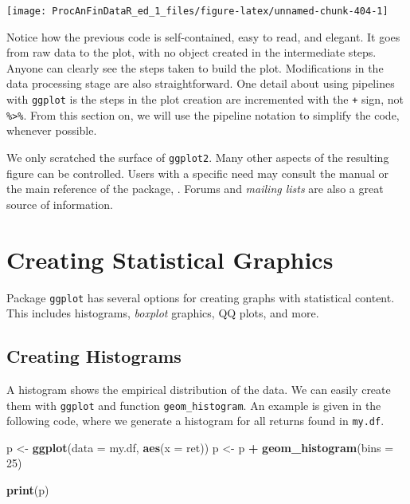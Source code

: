 \documentclass[11pt,]{book}
\newenvironment{Shaded}{\begin{snugshade}}{\end{snugshade}}
\newcommand{\KeywordTok}[1]{\textcolor[rgb]{0.27,0.27,0.27}{\textbf{#1}}}
\newcommand{\DataTypeTok}[1]{\textcolor[rgb]{0.27,0.27,0.27}{#1}}
\newcommand{\DecValTok}[1]{\textcolor[rgb]{0.06,0.06,0.06}{#1}}
\newcommand{\StringTok}[1]{\textcolor[rgb]{0.5,0.5,0.5}{#1}}
\newcommand{\OperatorTok}[1]{\textcolor[rgb]{0.81,0.36,0.00}{\textbf{#1}}}
\newcommand{\NormalTok}[1]{#1}
\begin{document}
\begin{center}\texttt{[image: ProcAnFinDataR\_ed\_1\_files/figure-latex/unnamed-chunk-404-1]} \end{center}

Notice how the previous code is self-contained, easy to read, and
elegant. It goes from raw data to the plot, with no object created in
the intermediate steps. Anyone can clearly see the steps taken to build
the plot. Modifications in the data processing stage are also
straightforward. One detail about using pipelines with \texttt{ggplot}
is the steps in the plot creation are incremented with the \texttt{+}
sign, not \texttt{\%\textgreater{}\%}. From this section on, we will use
the pipeline notation to simplify the code, whenever possible.

We only scratched the surface of \texttt{ggplot2}. Many other aspects of
the resulting figure can be controlled. Users with a specific need may
consult the manual or the main reference of the package,
\citet{wickham2009ggplot2}. Forums and \emph{mailing lists} are also a
great source of information.

\section{Creating Statistical
Graphics}\label{creating-statistical-graphics}

Package \texttt{ggplot} has several options for creating graphs with
statistical content. This includes histograms, \emph{boxplot} graphics,
QQ plots, and more.

\subsection{Creating Histograms}\label{creating-histograms}

A histogram shows the empirical distribution of the data. We can easily
create them with \texttt{ggplot} and function \texttt{geom\_histogram}.
An example is given in the following code, where we generate a histogram
for all returns found in \texttt{my.df}.

\begin{Shaded}
\begin{Highlighting}[]
\NormalTok{p <-}\StringTok{ }\KeywordTok{ggplot}\NormalTok{(}\DataTypeTok{data =}\NormalTok{ my.df, }\KeywordTok{aes}\NormalTok{(}\DataTypeTok{x =}\NormalTok{ ret))}
\NormalTok{p <-}\StringTok{ }\NormalTok{p }\OperatorTok{+}\StringTok{ }\KeywordTok{geom_histogram}\NormalTok{(}\DataTypeTok{bins =} \DecValTok{25}\NormalTok{)}
  
\KeywordTok{print}\NormalTok{(p)}
\end{Highlighting}
\end{Shaded}
\end{document}

